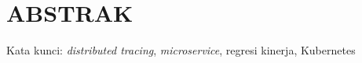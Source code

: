 \clearpage
\chapter*{ABSTRAK}



\vspace{15mm}
Kata kunci: \textit{distributed tracing}, \textit{microservice}, regresi kinerja, Kubernetes
\clearpage